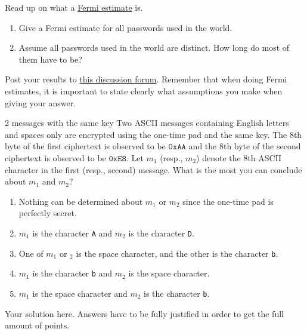 \documentclass[a4paper,10pt]{article}
\begin{document}

\begin{groupproject}{8}
Read up on what a
\href{https://en.wikipedia.org/wiki/Fermi_problem}{Fermi estimate}
is.
\begin{enumerate}
\item Give a Fermi estimate for all passwords used in the world.
\item Assume all passwords used in the world are distinct. How long do
  most of them have to be?
\end{enumerate}

Post your results to \href{https://canvas.uva.nl/courses/10514/discussion_topics/76834?module_item_id=282355}{this discussion forum}. Remember that when doing Fermi estimates, it is important to state clearly what assumptions you make when giving your answer.
\end{groupproject}


\begin{nquestion}{1}{2 messages with the same key}
Two ASCII messages containing English letters and spaces only are encrypted using the one-time pad and the same key. The 8th byte of the first ciphertext is observed to be $\mathtt{0xAA}$ and the 8th byte of the second ciphertext is observed to be $\mathtt{0xE8}$. Let $m_1$ (resp., $m_2$) denote the 8th ASCII character in the first (resp., second) message. What is the most you can conclude about $m_1$ and $m_2$?
\begin{enumerate}
\item Nothing can be determined about $m_1$ or $m_2$ since the one-time pad is perfectly secret.
\item $m_1$ is the character \texttt{A} and $m_2$ is the character \texttt{D}.
\item One of $m_1$ or $_2$ is the space character, and the other is the character \texttt{b}.
\item $m_1$ is the character \texttt{b} and $m_2$ is the space character.
\item $m_1$ is the space character and $m_2$ is the character \texttt{b}.
\end{enumerate}
\end{nquestion}

\begin{solution}
  Your solution here. Answers have to be fully justified in order to get the full amount of points.
\end{solution}
\end{document}
